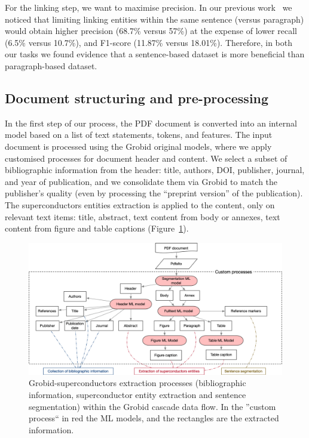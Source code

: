 \documentclass[]{interact}
\theoremstyle{plain}%
\theoremstyle{definition}
\theoremstyle{remark}
\begin{document}
For the linking step, we want to maximise precision. 
In our previous work~\cite{foppiano2019proposal} we noticed that limiting linking entities within the same sentence (versus paragraph) would obtain higher precision (68.7\% versus 57\%) at the expense of lower recall (6.5\% versus 10.7\%), and F1-score (11.87\% versus 18.01\%).
Therefore, in both our tasks we found evidence that a sentence-based dataset is more beneficial than paragraph-based dataset.


\subsection{Document structuring and pre-processing}
\label{subsubsec:document-structuring}
In the first step of our process, the PDF document is converted into an internal model based on a list of text statements, tokens, and features.
The input document is processed using the Grobid original models, where we apply customised processes for document header and content.
We select a subset of bibliographic information from the header: title, authors, DOI, publisher, journal, and year of publication, and we consolidate them via Grobid to match the publisher's quality (even by processing the ``preprint version'' of the publication).
The superconductors entities extraction is applied to the content, only on relevant text items: title, abstract, text content from body or annexes, text content from figure and table captions (Figure~\ref{fig:grobid-document-processing}).

\begin{figure}[ht]
    \includegraphics[width=\textwidth]{document-structuring-colors}
    \caption{Grobid-superconductors extraction processes (bibliographic information, superconductor entity extraction and sentence segmentation) within the Grobid cascade data flow. In the ''custom process`` in red the ML models, and the rectangles are the extracted information.}
    \label{fig:grobid-document-processing}
\end{figure}
\end{document}
